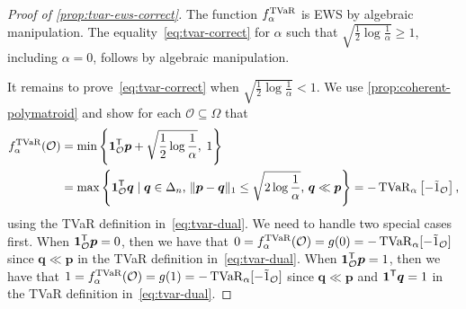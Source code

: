 \begin{proof}[Proof of \cref{prop:tvar-ews-correct}]
  The function $f_{\alpha }^{\operatorname{TVaR}}$ is EWS by algebraic manipulation. The equality~\eqref{eq:tvar-correct} for $\alpha$ such that $\sqrt{\frac{1}{2} \log \frac{1}{\alpha} } \ge 1$, including $\alpha = 0$, follows by algebraic manipulation.

  It remains to prove~\eqref{eq:tvar-correct} when $\sqrt{\frac{1}{2} \log \frac{1}{\alpha} } < 1$. We use \cref{prop:coherent-polymatroid} and show for each $\mathcal{O} \subseteq \Omega$ that
\begin{equation}\label{eq:tvar-eq-submodular}
  \begin{aligned}
f_{\alpha}^{\operatorname{TVaR}}(\mathcal{O}) 
  &=
\min\left\{ \bm{1}_{\mathcal{O}}^{\mathsf{T}} \bm{p} + \sqrt{\frac{1}{2} \log \frac{1}{\alpha}},\; 1 \right\} \\
  &=
\max \left\{ \bm{1}_{\mathcal{O}}^{\mathsf{T}} \bm{q} \mid 
\bm{q} \in \Delta_n, \,
\|\bm{p} -\bm{q}\|_1 \le \sqrt{2 \log \frac{1}{\alpha}}, \,
\bm{q} \ll \bm{p}
\right\}
=
  -\operatorname{TVaR}_{\alpha } \left[- \tilde{1}_{\mathcal{O}}\right],
  \end{aligned}
\end{equation}
using the TVaR definition in~\eqref{eq:tvar-dual}. We need to handle two special cases first. When $\bm{1}_{\mathcal{O}}^{\mathsf{T}} \bm{p} = 0$, then we have that $0 = f^{\operatorname{TVaR}}_{\alpha}(\mathcal{O}) = g(0) = -\operatorname{TVaR}_{\alpha}[-\tilde{1}_{\mathcal{O}}]$ since $\bm{q} \ll \bm{p}$ in the TVaR definition in~\eqref{eq:tvar-dual}. When $\bm{1}_{\mathcal{O}}^{\mathsf{T}} \bm{p} = 1$, then we have that $1 = f^{\operatorname{TVaR}}_{\alpha}(\mathcal{O}) = g(1) = -\operatorname{TVaR}_{\alpha}[-\tilde{1}_{\mathcal{O}}]$ since $\bm{q} \ll \bm{p}$ and $\bm{1}^{\mathsf{T}} \bm{q} = 1$ in the TVaR definition in~\eqref{eq:tvar-dual}.


\end{proof}

